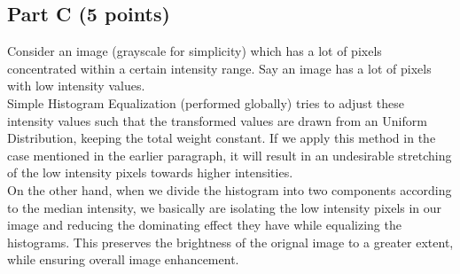 \documentclass[12pt, a4paper]{article}
\begin{document}
\subsection*{Part C (5 points)}
\quad Consider an image (grayscale for simplicity) which has a lot of pixels concentrated within a certain intensity range. Say an image has a lot of pixels with low intensity values. \\ 
\null\quad Simple Histogram Equalization (performed globally) tries to adjust these intensity values such that the transformed values are drawn from an Uniform Distribution, keeping the total weight constant. If we apply this method in the case mentioned in the earlier paragraph, it will result in an undesirable stretching of the low intensity pixels towards higher intensities. \\
\null\quad On the other hand, when we divide the histogram into two components according to the median intensity, we basically are isolating the low intensity pixels in our image and reducing the dominating effect they have while equalizing the histograms. This preserves the brightness of the orignal image to a greater extent, while ensuring overall image enhancement.
\end{document}
